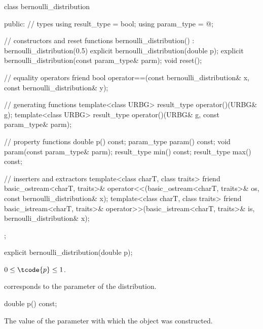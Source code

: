 %
%
\begin{codeblock}
class bernoulli_distribution {
public:
  // types
  using result_type = bool;
  using param_type  = @\unspec@;

  // constructors and reset functions
  bernoulli_distribution() : bernoulli_distribution(0.5) {}
  explicit bernoulli_distribution(double p);
  explicit bernoulli_distribution(const param_type& parm);
  void reset();

  // equality operators
  friend bool operator==(const bernoulli_distribution& x, const bernoulli_distribution& y);

  // generating functions
  template<class URBG>
    result_type operator()(URBG& g);
  template<class URBG>
    result_type operator()(URBG& g, const param_type& parm);

  // property functions
  double p() const;
  param_type param() const;
  void param(const param_type& parm);
  result_type min() const;
  result_type max() const;

  // inserters and extractors
  template<class charT, class traits>
    friend basic_ostream<charT, traits>&
      operator<<(basic_ostream<charT, traits>& os, const bernoulli_distribution& x);
  template<class charT, class traits>
    friend basic_istream<charT, traits>&
      operator>>(basic_istream<charT, traits>& is, bernoulli_distribution& x);
};
\end{codeblock}


%
\begin{itemdecl}
explicit bernoulli_distribution(double p);
\end{itemdecl}

\begin{itemdescr}
\pnum
\expects
$0 \leq \tcode{p} \leq 1$.

\pnum
\remarks
 corresponds to the parameter of the distribution.
\end{itemdescr}

%
\begin{itemdecl}
double p() const;
\end{itemdecl}

\begin{itemdescr}
\pnum
\returns
The value of the  parameter
 with which the object was constructed.
\end{itemdescr}

